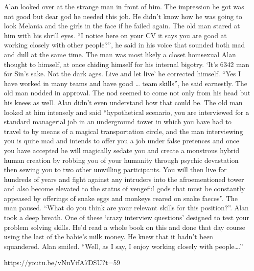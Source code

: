 Alan looked over at the strange man in front of him. The impression he got was not good but dear god he needed this job. He didn’t know how he was going to look Melania and the girls in the face if he failed again. The old man stared at him with his shrill eyes. “I notice here on your CV it says you are good at working closely with other people?”, he said in his voice that sounded both mad and dull at the same time. The man was most likely a closet homsexual Alan thought to himself, at once chiding himself for his internal bigotry. ‘It’s 6342 man for Sin’s sake. Not the dark ages. Live and let live’ he corrected himself. “Yes I have worked in many teams and have good … team skills”, he said earnestly. The old man nodded in approval. The nod seemed to come not only from his head but his knees as well. Alan didn’t even understand how that could be. The old man looked at him intensely and said “hypothetical scenario, you are interviewed for a standard managerial job in an underground tower in which you have had to travel to by means of a magical transportation circle, and the man interviewing you is quite mad and intends to offer you a job under false pretences and once you have accepted he will magically sedate you and create a monstrous hybrid human creation by robbing you of your humanity through psychic devastation then sewing you to two other unwilling participants. You will then live for hundreds of years and fight against any intruders into the afroementioned tower and also become elevated to the status of vengeful gods that must be constantly appeased by offerings of snake eggs and monkeys reared on snake faeces”. The man paused. “What do you think are your relevant skills for this position?”. Alan took a deep breath. One of these ‘crazy interview questions’ designed to test your problem solving skills. He’d read a whole book on this and done that day course using the last of the babie’s milk money. He knew that it hadn’t been squandered. Alan smiled. “Well, as I say, I enjoy working closely with people….”\medskip

https://youtu.be/vNuVifA7DSU?t=59



\vspace*{5mm}

